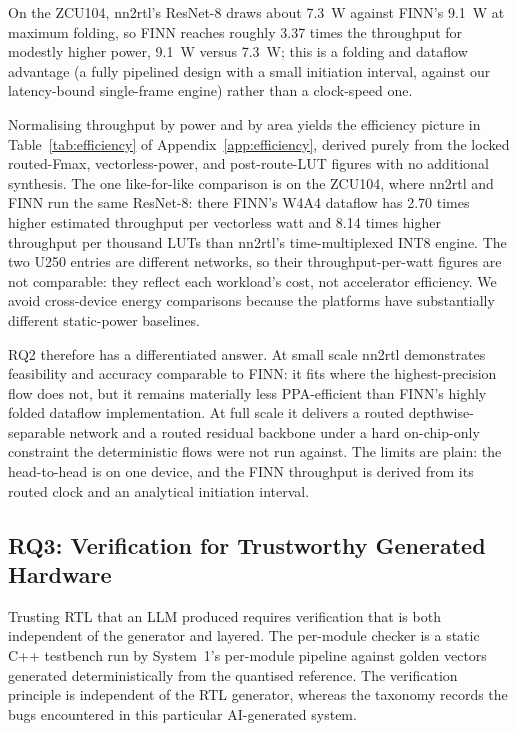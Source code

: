 \documentclass[acmtog,authorversion]{acmart}
\begin{document}
On the ZCU104, nn2rtl's ResNet-8 draws about 7.3~W against FINN's 9.1~W at maximum folding, so FINN reaches roughly 3.37 times the throughput for modestly higher power, 9.1~W versus 7.3~W; this is a folding and dataflow advantage (a fully pipelined design with a small initiation interval, against our latency-bound single-frame engine) rather than a clock-speed one.

Normalising throughput by power and by area yields the efficiency picture in Table~\ref{tab:efficiency} of Appendix~\ref{app:efficiency}, derived purely from the locked routed-Fmax, vectorless-power, and post-route-LUT figures with no additional synthesis. The one like-for-like comparison is on the ZCU104, where nn2rtl and FINN run the same ResNet-8: there FINN's W4A4 dataflow has 2.70 times higher estimated throughput per vectorless watt and 8.14 times higher throughput per thousand LUTs than nn2rtl's time-multiplexed INT8 engine. The two U250 entries are different networks, so their throughput-per-watt figures are not comparable: they reflect each workload's cost, not accelerator efficiency. We avoid cross-device energy comparisons because the platforms have substantially different static-power baselines.

RQ2 therefore has a differentiated answer. At small scale nn2rtl demonstrates feasibility and accuracy comparable to FINN: it fits where the highest-precision flow does not, but it remains materially less PPA-efficient than FINN's highly folded dataflow implementation. At full scale it delivers a routed depthwise-separable network and a routed residual backbone under a hard on-chip-only constraint the deterministic flows were not run against. The limits are plain: the head-to-head is on one device, and the FINN throughput is derived from its routed clock and an analytical initiation interval.

\subsection{RQ3: Verification for Trustworthy Generated Hardware}\label{sec:rq3}

Trusting RTL that an LLM produced requires verification that is both independent of the generator and layered. The per-module checker is a static C++ testbench run by System~1's per-module pipeline against golden vectors generated deterministically from the quantised reference. The verification principle is independent of the RTL generator, whereas the taxonomy records the bugs encountered in this particular AI-generated system.
\end{document}

